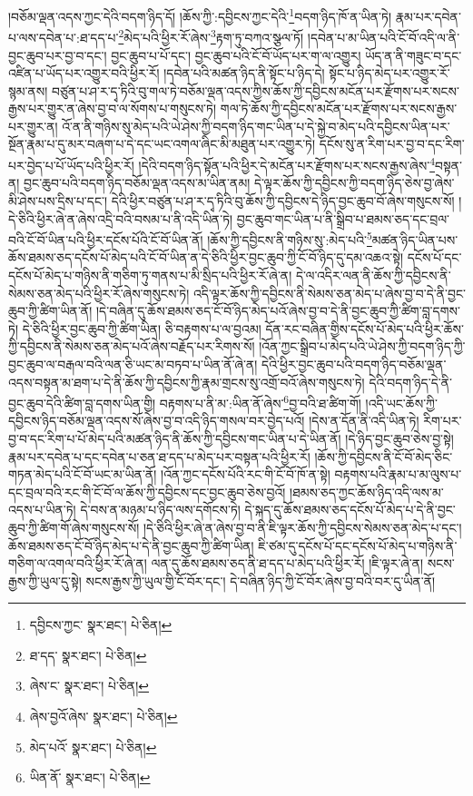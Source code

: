 །བཅོམ་ལྡན་འདས་ཀྱང་དེའི་བདག་ཉིད་དོ། །ཆོས་ཀྱི་:དབྱིངས་ཀྱང་དེའི་\footnote{དབྱིངས་ཀྱང་  སྣར་ཐང་།  པེ་ཅིན། }བདག་ཉིད་ཁོ་ན་ཡིན་ཏེ། རྣམ་པར་དབེན་པ་ལས་དབེན་པ་:ཐ་དད་པ་\footnote{ཐ་དད་  སྣར་ཐང་།  པེ་ཅིན། }མེད་པའི་ཕྱིར་རོ་ཞེས་\footnote{ཞེས་ང་  སྣར་ཐང་།  པེ་ཅིན། }རྟག་ཏུ་བཀའ་སྩལ་ཏོ། །དབེན་པ་མ་ཡིན་པའི་ངོ་བོ་འདི་ལ་ནི་བྱང་ཆུབ་པར་བྱ་བ་དང་། བྱང་ཆུབ་པ་པོ་དང་། བྱང་ཆུབ་པའི་ངོ་བོ་ཡོད་པར་ག་ལ་འགྱུར། ཡོད་ན་ནི་གཟུང་བ་དང་འཛིན་པ་ཡོད་པར་འགྱུར་བའི་ཕྱིར་རོ། །དབེན་པའི་མཚན་ཉིད་ནི་སྟོང་པ་ཉིད་དེ། སྟོང་པ་ཉིད་མེད་པར་འགྱུར་རོ་སྙམ་ནས། བཙུན་པ་ཤ་ར་དྭ་ཏིའི་བུ་གལ་ཏེ་བཅོམ་ལྡན་འདས་ཀྱིས་ཆོས་ཀྱི་དབྱིངས་མངོན་པར་རྫོགས་པར་སངས་རྒྱས་པར་གྱུར་ན་ཞེས་བྱ་བ་ལ་སོགས་པ་གསུངས་ཏེ། གལ་ཏེ་ཆོས་ཀྱི་དབྱིངས་མངོན་པར་རྫོགས་པར་སངས་རྒྱས་པར་གྱུར་ན། འོ་ན་ནི་གཉིས་སུ་མེད་པའི་ཡེ་ཤེས་ཀྱི་བདག་ཉིད་གང་ཡིན་པ་དེ་སྐྱེ་བ་མེད་པའི་དབྱིངས་ཡིན་པར་སྔོན་རྣམ་པ་དུ་མར་བཞག་པ་དེ་དང་ཡང་འགལ་ཞིང་མི་མཐུན་པར་འགྱུར་ཏེ། དངོས་སུ་ན་རིག་པར་བྱ་བ་དང་རིག་པར་བྱེད་པ་པོ་ཡོད་པའི་ཕྱིར་རོ། །དེའི་བདག་ཉིད་སྟོན་པའི་ཕྱིར་དེ་མངོན་པར་རྫོགས་པར་སངས་རྒྱས་ཞེས་\footnote{ཞེས་བྱའོ་ཞེས་  སྣར་ཐང་།  པེ་ཅིན། }བསྟན་ན། བྱང་ཆུབ་པའི་བདག་ཉིད་བཅོམ་ལྡན་འདས་མ་ཡིན་ནམ། དེ་ལྟར་ཆོས་ཀྱི་དབྱིངས་ཀྱི་བདག་ཉིད་ཅེས་བྱ་ཞེས་མི་ཤེས་པས་དྲིས་པ་དང་། དེའི་ཕྱིར་བཙུན་པ་ཤ་ར་དྭ་ཏིའི་བུ་ཆོས་ཀྱི་དབྱིངས་དེ་ཉིད་བྱང་ཆུབ་བོ་ཞེས་གསུངས་སོ། །དེ་ཅིའི་ཕྱིར་ཞེ་ན་ཞེས་འདྲི་བའི་བསམ་པ་ནི་འདི་ཡིན་ཏེ། བྱང་ཆུབ་གང་ཡིན་པ་ནི་སྒྲིབ་པ་ཐམས་ཅད་དང་བྲལ་བའི་ངོ་བོ་ཡིན་པའི་ཕྱིར་དངོས་པོའི་ངོ་བོ་ཡིན་ནོ། །ཆོས་ཀྱི་དབྱིངས་ནི་གཉིས་སུ་:མེད་པའི་\footnote{མེད་པའོ་  སྣར་ཐང་།  པེ་ཅིན། }མཚན་ཉིད་ཡིན་པས་ཆོས་ཐམས་ཅད་དངོས་པོ་མེད་པའི་ངོ་བོ་ཡིན་ན་དེ་ཅིའི་ཕྱིར་བྱང་ཆུབ་ཀྱི་ངོ་བོ་ཉིད་དུ་དམ་འཆའ་སྟེ། དངོས་པོ་དང་དངོས་པོ་མེད་པ་གཉིས་ནི་གཅིག་ཏུ་གནས་པ་མི་སྲིད་པའི་ཕྱིར་རོ་ཞེ་ན། དེ་ལ་འདིར་ལན་ནི་ཆོས་ཀྱི་དབྱིངས་ནི་སེམས་ཅན་མེད་པའི་ཕྱིར་རོ་ཞེས་གསུངས་ཏེ། འདི་ལྟར་ཆོས་ཀྱི་དབྱིངས་ནི་སེམས་ཅན་མེད་པ་ཞེས་བྱ་བ་དེ་ནི་བྱང་ཆུབ་ཀྱི་ཚིག་ཡིན་ནོ། །དེ་བཞིན་དུ་ཆོས་ཐམས་ཅད་ངོ་བོ་ཉིད་མེད་པའོ་ཞེས་བྱ་བ་དེ་ནི་བྱང་ཆུབ་ཀྱི་ཚིག་བླ་དགས་ཏེ། དེ་ཅིའི་ཕྱིར་བྱང་ཆུབ་ཀྱི་ཚིག་ཡིན། ཅི་བརྟགས་པ་ལ་བྱའམ། དོན་རང་བཞིན་གྱིས་དངོས་པོ་མེད་པའི་ཕྱིར་ཆོས་ཀྱི་དབྱིངས་ནི་སེམས་ཅན་མེད་པའོ་ཞེས་བརྗོད་པར་རིགས་སོ། །འོན་ཀྱང་སྒྲིབ་པ་མེད་པའི་ཡེ་ཤེས་ཀྱི་བདག་ཉིད་ཀྱི་བྱང་ཆུབ་ལ་བརྒལ་བའི་ལན་ཅི་ཡང་མ་བཏབ་པ་ཡིན་ནོ་ཞེ་ན། དེའི་ཕྱིར་བྱང་ཆུབ་པའི་བདག་ཉིད་བཅོམ་ལྡན་འདས་བསྟན་མ་ཐག་པ་དེ་ནི་ཆོས་ཀྱི་དབྱིངས་ཀྱི་རྣམ་གྲངས་སུ་འགྲོ་བའོ་ཞེས་གསུངས་ཏེ། དེའི་བདག་ཉིད་དེ་ནི་བྱང་ཆུབ་དེའི་ཚིག་བླ་དགས་ཡིན་གྱི། བརྟགས་པ་ནི་མ་:ཡིན་ནོ་ཞེས་\footnote{ཡིན་ནོ་  སྣར་ཐང་།  པེ་ཅིན། }བྱ་བའི་ཐ་ཚིག་གོ། །འདི་ཡང་ཆོས་ཀྱི་དབྱིངས་ཉིད་བཅོམ་ལྡན་འདས་སོ་ཞེས་བྱ་བ་འདི་ཉིད་གསལ་བར་བྱེད་པའོ། །དེས་ན་དོན་ནི་འདི་ཡིན་ཏེ། རིག་པར་བྱ་བ་དང་རིག་པ་པོ་མེད་པའི་མཚན་ཉིད་ནི་ཆོས་ཀྱི་དབྱིངས་གང་ཡིན་པ་དེ་ཡིན་ནོ། །དེ་ཉིད་བྱང་ཆུབ་ཅེས་བྱ་སྟེ། རྣམ་པར་དབེན་པ་དང་དབེན་པ་ཅན་ཐ་དད་པ་མེད་པར་བསྟན་པའི་ཕྱིར་རོ། །ཆོས་ཀྱི་དབྱིངས་ནི་ངོ་བོ་མེད་ཅིང་གཏན་མེད་པའི་ངོ་བོ་ཡང་མ་ཡིན་ནོ། །འོན་ཀྱང་དངོས་པོའི་རང་གི་ངོ་བོ་ཁོ་ན་སྟེ། བརྟགས་པའི་རྣམ་པ་མ་ལུས་པ་དང་བྲལ་བའི་རང་གི་ངོ་བོ་ལ་ཆོས་ཀྱི་དབྱིངས་དང་བྱང་ཆུབ་ཅེས་བྱའོ། །ཐམས་ཅད་ཀྱང་ཆོས་ཉིད་འདི་ལས་མ་འདས་པ་ཡིན་ཏེ། དེ་བས་ན་མཉམ་པ་ཉིད་ལས་དགོངས་ཏེ། དེ་སྐད་དུ་ཆོས་ཐམས་ཅད་དངོས་པོ་མེད་པ་དེ་ནི་བྱང་ཆུབ་ཀྱི་ཚིག་གོ་ཞེས་གསུངས་སོ། །དེ་ཅིའི་ཕྱིར་ཞེ་ན་ཞེས་བྱ་བ་ནི་ཇི་ལྟར་ཆོས་ཀྱི་དབྱིངས་སེམས་ཅན་མེད་པ་དང་། ཆོས་ཐམས་ཅད་ངོ་བོ་ཉིད་མེད་པ་དེ་ནི་བྱང་ཆུབ་ཀྱི་ཚིག་ཡིན། ཇི་ཙམ་དུ་དངོས་པོ་དང་དངོས་པོ་མེད་པ་གཉིས་ནི་གཅིག་ལ་འགལ་བའི་ཕྱིར་རོ་ཞེ་ན། ལན་དུ་ཆོས་ཐམས་ཅད་ནི་ཐ་དད་པ་མེད་པའི་ཕྱིར་རོ། །ཇི་ལྟར་ཞེ་ན། སངས་རྒྱས་ཀྱི་ཡུལ་དུ་སྟེ། སངས་རྒྱས་ཀྱི་ཡུལ་གྱི་ངོ་བོར་དང་། དེ་བཞིན་ཉིད་ཀྱི་ངོ་བོར་ཞེས་བྱ་བའི་བར་དུ་ཡིན་ནོ། 